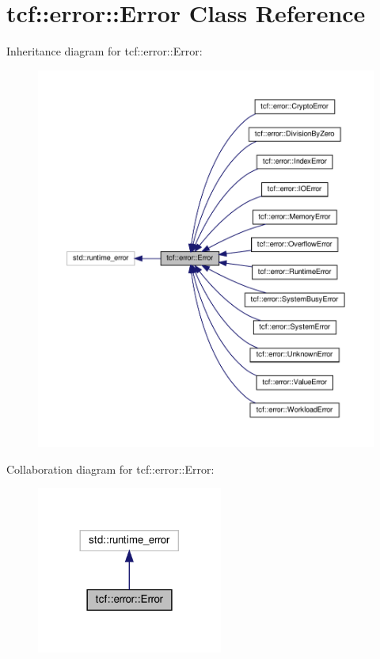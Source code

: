 \hypertarget{classtcf_1_1error_1_1Error}{}\section{tcf\+:\+:error\+:\+:Error Class Reference}
\label{classtcf_1_1error_1_1Error}


Inheritance diagram for tcf\+:\+:error\+:\+:Error\+:
\nopagebreak
\begin{figure}[H]
\begin{center}
\leavevmode
\includegraphics[width=350pt]{classtcf_1_1error_1_1Error__inherit__graph}
\end{center}
\end{figure}


Collaboration diagram for tcf\+:\+:error\+:\+:Error\+:
\nopagebreak
\begin{figure}[H]
\begin{center}
\leavevmode
\includegraphics[width=173pt]{classtcf_1_1error_1_1Error__coll__graph}
\end{center}
\end{figure}
